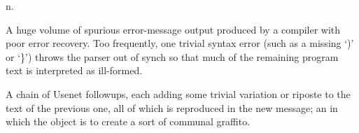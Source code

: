 n.

\begin{inparaenum}
\item A huge volume of spurious error-message output produced by a compiler with
    poor error recovery. Too frequently, one trivial syntax error (such as a
    missing `)' or `\}') throws the parser out of synch so that much of the
    remaining program text is interpreted as ill-formed.
\item A chain of Usenet followups, each adding some trivial variation or riposte
    to the text of the previous one, all of which is reproduced in the new
    message; an  in which the object is to create a sort
    of communal graffito.
\end{inparaenum}

